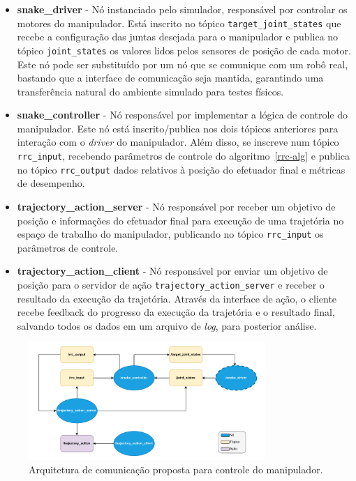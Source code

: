 \begin{itemize}
    \item \textbf{snake\_driver} {-} Nó instanciado pelo simulador, responsável por controlar os motores do manipulador.
          Está inscrito no tópico \texttt{target\_joint\_states} que recebe a configuração das juntas desejada para o manipulador
          e publica no tópico \texttt{joint\_states} os valores lidos pelos sensores de posição de cada motor. Este nó pode ser substituído por um nó
          que se comunique com um robô real, bastando que a interface de comunicação seja mantida, garantindo uma transferência natural do ambiente simulado para testes físicos.

    \item \textbf{snake\_controller} {-} Nó responsável por implementar a lógica de controle do manipulador. Este nó está inscrito/publica nos dois tópicos
          anteriores para interação com o \emph{driver} do manipulador. Além disso, se inscreve
          num tópico \texttt{rrc\_input}, recebendo parâmetros de controle do algoritmo~\ref{rrc-alg} e publica no tópico \texttt{rrc\_output} dados
          relativos à posição do efetuador final e métricas de desempenho.

    \item \textbf{trajectory\_action\_server} {-} Nó responsável por receber um objetivo de posição e informações do efetuador final para execução de uma trajetória
          no espaço de trabalho do manipulador, publicando no tópico \texttt{rrc\_input} os parâmetros de controle.

    \item \textbf{trajectory\_action\_client} {-} Nó responsável por enviar um objetivo de posição para o servidor de ação \texttt{trajectory\_action\_server} e
          receber o resultado da execução da trajetória. Através da interface de ação, o cliente recebe feedback do progresso da execução da trajetória e o resultado final,
          salvando todos os dados em um arquivo de \emph{log}, para posterior análise.
\end{itemize}

\begin{figure}
    \centering
    \includegraphics[width=0.8\textwidth]{./Images/ros-arch.pdf}
    \caption{Arquitetura de comunicação proposta para controle do manipulador.}\label{fig:coms_arch}
\end{figure}

